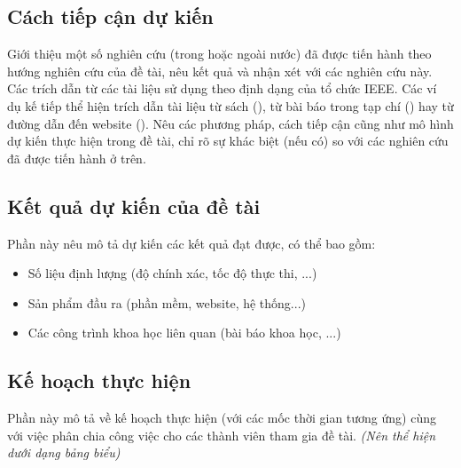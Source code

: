 \documentclass{article}[14pt]
\begin{document}
{    \subsection{Cách tiếp cận dự kiến}
    
    Giới thiệu một số nghiên cứu (trong hoặc ngoài nước) đã được tiến hành theo hướng nghiên cứu của đề tài, nêu kết quả và nhận xét với các nghiên cứu này. Các trích dẫn từ các tài liệu sử dụng theo định dạng của tổ chức IEEE. Các ví dụ kế tiếp thể hiện trích dẫn tài liệu từ sách (\cite{latexcompanion}), từ bài báo trong tạp chí (\cite{einstein}) hay từ đường dẫn đến website (\cite{knuthwebsite}). \newline
    Nêu các phương pháp, cách tiếp cận cũng như mô hình dự kiến thực hiện trong đề tài, chỉ rõ sự khác biệt (nếu có) so với các nghiên cứu đã được tiến hành ở trên.
    
    
    
    \subsection{Kết quả dự kiến của đề tài}
        
    Phần này nêu mô tả dự kiến các kết quả đạt được, có thể bao gồm: 
    \begin{itemize}
        \item Số liệu định lượng (độ chính xác, tốc độ thực thi, ...)
        \item Sản phẩm đầu ra (phần mềm, website, hệ thống...)
        \item Các công trình khoa học liên quan (bài báo khoa học, ...)
    \end{itemize}
    
    \subsection{Kế hoạch thực hiện}
        
    Phần này mô tả về kế hoạch thực hiện (với các mốc thời gian tương ứng) cùng với việc phân chia công việc cho các thành viên tham gia đề tài. \textit{(Nên thể hiện dưới dạng bảng biểu)}
    
    
    }
    
    \pagebreak 
    
    
    \nocite{*}
\end{document}
